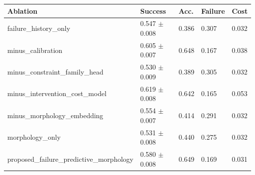 \begin{tabular}{lllll}
\toprule
Ablation & Success & Acc. & Failure & Cost \\
\midrule
failure\_history\_only & 0.547 $\pm$ 0.008 & 0.386 & 0.307 & 0.032 \\
minus\_calibration & 0.605 $\pm$ 0.007 & 0.648 & 0.167 & 0.038 \\
minus\_constraint\_family\_head & 0.530 $\pm$ 0.009 & 0.389 & 0.305 & 0.032 \\
minus\_intervention\_cost\_model & 0.619 $\pm$ 0.008 & 0.642 & 0.165 & 0.053 \\
minus\_morphology\_embedding & 0.554 $\pm$ 0.007 & 0.414 & 0.291 & 0.032 \\
morphology\_only & 0.531 $\pm$ 0.008 & 0.440 & 0.275 & 0.032 \\
proposed\_failure\_predictive\_morphology & 0.580 $\pm$ 0.008 & 0.649 & 0.169 & 0.031 \\
\bottomrule
\end{tabular}
